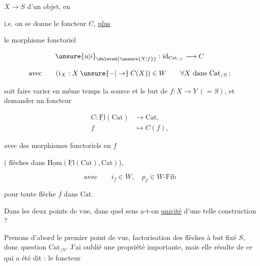  $X\longrightarrow S$ d'un objet, en


i.e. on se donne le foncteur $C$, \uline{plus}

le morphisme fonctoriel

\[
\unsure{u|i}_{\deleted{\unsure{X|f}}}:\mathrm{id}_{\mathrm{Cat}_{/S}}\longrightarrow C
\]

\[
\text{avec}\qquad (i_X:X\mathbin{\unsure{-|\to}}C(X))\in W\qquad \forall X\ \text{dans }\mathrm{Cat}_{/S}\,;
\]

soit   faire varier en même temps la source et le but de $f:X\longrightarrow Y\ (=S)$, et demander un foncteur 

\[
\begin{aligned}
C:\underline{\mathrm{Fl}}(\mathrm{Cat})&\longrightarrow\mathrm{Cat},\\
f&\longmapsto C(f),
\end{aligned}
\]

avec des morphismes fonctoriels en $f$


( flèches dans $\underline{\mathrm{Hom}}(\underline{\mathrm{Fl}}(\mathrm{Cat}),\mathrm{Cat})$),

\[
\text{avec}\qquad i_f\in W,\quad p_f\in W\text{-}\mathrm{Fib}
\]

pour toute flèche $f$ dans $\mathrm{Cat}$.

Dans les deux points de vue, dans quel sens a-t-on \uline{unicité} d'une telle construction ?

Prenons d'abord le premier point de vue, factorisation des flèches à but fixé $S$, donc question  $\mathrm{Cat}_{/S}$. J'ai oublié une propriété importante, mais elle résulte de ce qui a été dit : le foncteur

